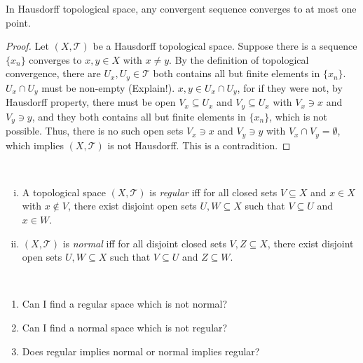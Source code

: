 \begin{lemma}
	In Hausdorff topological space, any convergent sequence converges to at most one point.
\end{lemma}

\begin{proof}
	Let $(X, \mathcal T)$ be a Hausdorff topological space. Suppose there is a sequence $\{x_n\}$ converges to $x,y \in X$ with $x \ne y$. By the definition of topological convergence, there are $U_x, U_y \in \mathcal T$ both contains all but finite elements in $\{x_n\}$. $U_x \cap U_y$ must be non-empty (Explain!). $x,y \in U_x \cap U_y$, for if they were not, by Hausdorff property, there must be open $V_x \subseteq U_x$ and $V_y \subseteq U_x$ with $V_x \ni x$ and $V_y \ni y$, and they both contains all but finite elements in $\{x_n\}$, which is not possible. Thus, there is no such open sets $V_x \ni x$ and $V_y \ni y$ with $V_x \cap V_y = \emptyset$, which implies $(X, \mathcal T)$ is not Hausdorff. This is a contradition.
\end{proof}


\begin{definition} \
	\begin{enumerate}[(i)]
		\item A topological space $(X, \mathcal T)$ is \textit{regular} iff for all closed sets $V \subseteq X$ and $x \in X$ with $x \notin V$, there exist disjoint open sets $U,W \subseteq X$ such that $V \subseteq U$ and $x \in W$.
		\item $(X, \mathcal T)$ is \textit{normal} iff for all disjoint closed sets $V, Z \subseteq X$, there exist disjoint open sets $U, W \subseteq X$ such that $V \subseteq U$ and $Z \subseteq W$.
	\end{enumerate}
\end{definition}


\begin{note}
	[To do] \
	\begin{enumerate}
		\item Can I find a regular space which is not normal?
		\item Can I find a normal space which is not regular?
		\item Does regular implies normal or normal implies regular?
	\end{enumerate}
\end{note}
































%